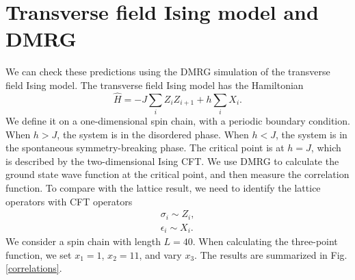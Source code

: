 \documentclass[prb,twocolumn,11pt]{revtex4-1}
\begin{document}
\section{Transverse field Ising model and DMRG}
We can check these predictions using the DMRG simulation of the transverse field Ising model. 
The transverse field Ising model has the Hamiltonian
\begin{equation}
    \hat{H}=-J \sum_{i} Z_i Z_{i+1}+h \sum_i X_i.
\end{equation}
We define it on a one-dimensional spin chain, with a periodic boundary condition. When $h>J$, the system is in the disordered phase. When $h<J$, the system is in the spontaneous symmetry-breaking phase. The critical point is at $h=J$, which is described by the two-dimensional Ising CFT.
We use DMRG to calculate the ground state wave function at the critical point, and then measure the correlation function. 
To compare with the lattice result, we need to identify the lattice operators with CFT operators
\begin{align}
    \sigma_i \sim Z_i,\nonumber\\
    \epsilon_i \sim X_i.
\end{align}
We consider a spin chain with length $L=40$. When calculating the three-point function, we set $x_1=1$, $x_2=11$, and vary $x_3$.
The results are summarized in Fig. \ref{correlations}. 
\end{document}
